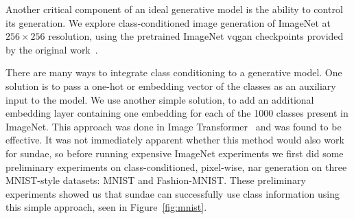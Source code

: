Another critical component of an ideal generative model is the ability to
control its generation. We explore class-conditioned image generation of
ImageNet at $256 \times 256$ resolution, using the pretrained ImageNet
\gls{vqgan} checkpoints provided by the original work~\cite{esser2021taming}. 

There are many ways to integrate class conditioning to a generative model. One
solution is to pass a one-hot or embedding vector of the classes as an auxiliary
input to the model. We use another simple solution, to add an additional
embedding layer containing one embedding for each of the 1000 classes present in
ImageNet. This approach was done in Image Transformer~\cite{parmar2018image} and
was found to be effective. It was not immediately apparent whether this method
would also work for \gls{sundae}, so before running expensive ImageNet
experiments we first did some preliminary experiments on class-conditioned,
pixel-wise, \gls{nar} generation on three MNIST-style datasets: MNIST and
Fashion-MNIST. These preliminary experiments showed us that \gls{sundae} can
successfully use class information using this simple approach, seen in
Figure~\ref{fig:mnist}.

